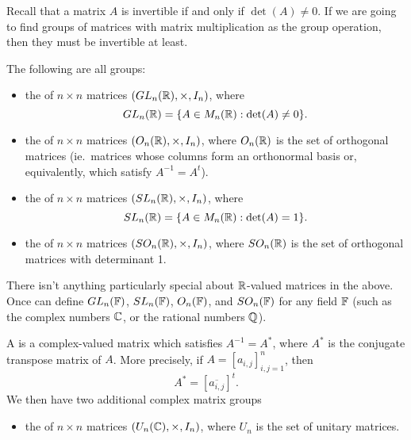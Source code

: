\begin{example}
  Recall that a matrix $A$ is invertible if and only if $\det(A) \ne 0$.
  If we are going to find groups of matrices with matrix multiplication as
  the group operation, then they must be invertible at least.
  
  The following are all groups:
  \begin{itemize}
    \item the  of $n \times n$ 
    matrices $(GL_{n}(\mathbb{R}), \times, I_{n})$, where
    \[
      GL_{n}(\mathbb{R}) = \{ A \in M_{n}(\mathbb{R}) : \det(A) \ne 0\}.
    \]
    
    \item the  of $n \times n$ 
    matrices $(O_{n}(\mathbb{R}), \times, I_{n})$, where $O_{n}(\mathbb{R})$
    is the set of orthogonal matrices (ie.\ matrices whose columns form an
    orthonormal basis or, equivalently, which satisfy $A^{-1} = A^{t}$).
    
    \item the  of $n \times
    n$ matrices $(SL_{n}(\mathbb{R}), \times, I_{n})$, where
    \[
      SL_{n}(\mathbb{R}) = \{ A \in M_{n}(\mathbb{R}) : \det(A) = 1\}.
    \]
    
    \item the  of
    $n \times n$ matrices $(SO_{n}(\mathbb{R}), \times, I_{n})$, where $SO_{n}(\mathbb{R})$
    is the set of orthogonal matrices with determinant 1.
  \end{itemize}
  
  There isn't anything particularly special about $\mathbb{R}$-valued matrices
  in the above.  Once can define $GL_{n}(\mathbb{F})$,  $SL_{n}(\mathbb{F})$, 
  $O_{n}(\mathbb{F})$, and $SO_{n}(\mathbb{F})$ for any field $\mathbb{F}$ (such as
  the complex numbers $\mathbb{C}$, or the rational numbers $\mathbb{Q}$).
  
  A  is a complex-valued matrix which
  satisfies $A^{-1} = A^{*}$, where $A^{*}$ is the conjugate transpose matrix
  of $A$.  More precisely, if $A = [a_{i,j}]_{i,j=1}^{n}$, then
  \[
    A^{*} = [\overline{a_{i,j}}]^{t}.
  \]
  We then have two additional complex matrix groups
  \begin{itemize}
   \item the  of $n \times n$ 
    matrices $(U_{n}(\mathbb{C}), \times, I_{n})$, where $U_{n}$
    is the set of unitary matrices.
    

\end{itemize}
\end{example}
